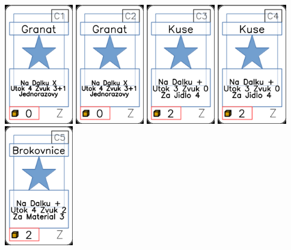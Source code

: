 \documentclass[a4paper]{article}
\begin{document}
	\includegraphics[width=3.0cm]{img-1_100}
	\includegraphics[width=3.0cm]{img-1_101}
	\includegraphics[width=3.0cm]{img-1_102}
	\includegraphics[width=3.0cm]{img-1_103}
	\includegraphics[width=3.0cm]{img-1_104}
\end{document}
